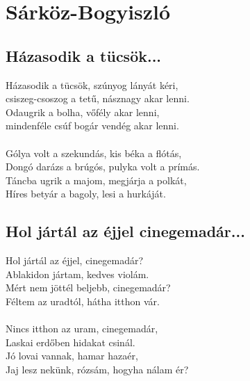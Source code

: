 \chapter{Sárköz-Bogyiszló}
	\section{Házasodik a tücsök...}
	Házasodik a tücsök, szúnyog lányát kéri,\\
	csiszeg-csoszog a tetű, násznagy akar lenni.\\
	Odaugrik a bolha, vőfély akar lenni,\\
	mindenféle csúf bogár vendég akar lenni.\\\\
	Gólya volt a szekundás, kis béka a flótás,\\
	Dongó darázs a brúgós, pulyka volt a prímás.\\
	Táncba ugrik a majom, megjárja a polkát,\\
	Híres betyár a bagoly, lesi a hurkáját.
	\section{Hol jártál az éjjel cinegemadár...}
	Hol jártál az éjjel, cinegemadár?\\
	Ablakidon jártam, kedves violám.\\
	Mért nem jöttél beljebb, cinegemadár?\\
	Féltem az uradtól, hátha itthon vár.\\\\
	Nincs itthon az uram, cinegemadár,\\
	Laskai erdőben hidakat csinál.\\
	Jó lovai vannak, hamar hazaér,\\
	Jaj lesz nekünk, rózsám, hogyha nálam ér?\\
